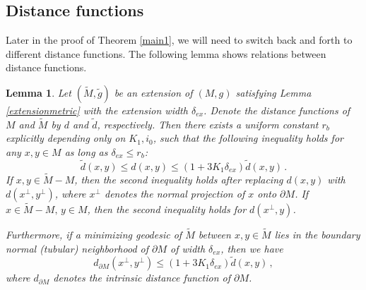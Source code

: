 \documentclass[11pt,letterpaper]{amsart}
\numberwithin{equation}{section}
\theoremstyle{definition}
\theoremstyle{plain}
\theoremstyle{definition}
\theoremstyle{plain}
\newtheorem{distances}[main1]{Lemma}
\theoremstyle{definition}
\theoremstyle{plain}
\begin{document}
\subsection{Distance functions} \hfill 

\smallskip
Later in the proof of Theorem \ref{main1}, we will need to switch back and forth to different distance functions. The following lemma shows relations between distance functions.

\begin{distances}\label{distances}
Let $(\widetilde{M},\widetilde{g})$ be an extension of $(M,g)$ satisfying Lemma \ref{extensionmetric} with the extension width $\delta_{ex}$. Denote the distance functions of $M$ and $\widetilde{M}$ by $d$ and $\widetilde{d}$, respectively. Then there exists a uniform constant $r_b$ explicitly depending only on $K_1,i_0$, such that the following inequality holds for any $x,y\in M$ as long as $\delta_{ex}\leqslant r_b$:
$$\widetilde{d}(x,y)\leqslant d(x,y)\leqslant (1+3K_1\delta_{ex})\widetilde{d}(x,y)\, .$$
If $x,y\in \widetilde{M}-M$, then the second inequality holds after replacing $d(x,y)$ with $d(x^{\perp},y^{\perp})$, where $x^{\perp}$ denotes the normal projection of $x$ onto $\partial M$. If $x\in \widetilde{M}-M,\,y\in M$, then the second inequality holds for $d(x^{\perp},y)$.

Furthermore, if a minimizing geodesic of $\widetilde{M}$ between $x,y \in \widetilde{M}$ lies in the boundary normal (tubular) neighborhood of $\partial M$ of width $\delta_{ex}$, then we have
$$d_{\partial M}(x^{\perp},y^{\perp})\leqslant (1+3K_1\delta_{ex})\widetilde{d}(x,y)\, ,$$
where $d_{\partial M}$ denotes the intrinsic distance function of $\partial M$.
\end{distances}
\end{document}
